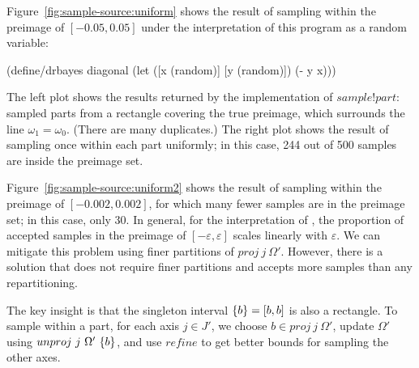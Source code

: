 Figure~\ref{fig:sample-source:uniform} shows the result of sampling within the preimage of $[-0.05,0.05]$ under the interpretation of this program as a random variable:
\begin{center}\singlespacing
\begin{schemedisplay}
(define/drbayes diagonal
  (let ([x  (random)]
        [y  (random)])
    (- y x)))
\end{schemedisplay}
\end{center}
The left plot shows the results returned by the implementation of $sample!part$: sampled parts from a rectangle covering the true preimage, which surrounds the line $\omega_1 = \omega_0$.
(There are many duplicates.)
The right plot shows the result of sampling once within each part uniformly; in this case, 244 out of 500 samples are inside the preimage set.

Figure~\ref{fig:sample-source:uniform2} shows the result of sampling within the preimage of $[-0.002,0.002]$, for which many fewer samples are in the preimage set; in this case, only 30.
In general, for the interpretation of , the proportion of accepted samples in the preimage of $[-\varepsilon,\varepsilon]$ scales linearly with $\varepsilon$.
We can mitigate this problem using finer partitions of $proj~j~\Omega'$.
However, there is a solution that does not require finer partitions and accepts more samples than any repartitioning.

The key insight is that the singleton interval $\{{b}\} = [b,b]$ is also a rectangle.
To sample within a part, for each axis $j \in J'$, we choose $b \in proj~j~\Omega'$, update $\Omega'$ using $unproj~j~\Omega'~\{{b}\}$, and use $refine$ to get better bounds for sampling the other axes.

